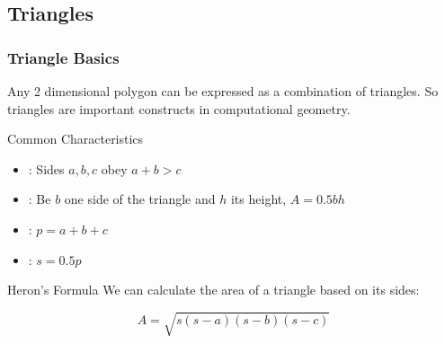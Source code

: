 \documentclass{beamer}
\begin{document}
\subsection{Triangles}
\begin{frame}
  \frametitle{Triangle Basics}
  {\smaller
    Any 2 dimensional polygon can be expressed as a combination of
    triangles. So triangles are important constructs in computational
    geometry.

    \begin{block}{Common Characteristics}
      \begin{itemize}
      \item {}: Sides $a,b,c$ obey $a+b > c$
      \item {}: Be $b$ one side of the triangle
        and $h$ its height, $A=0.5bh$
      \item {}: $p=a+b+c$
      \item {}: $s = 0.5p$
      \end{itemize}
    \end{block}

    \begin{block}{Heron's Formula}
      We can calculate the area of a triangle based on its sides:

      \begin{equation*}
        A = \sqrt{s(s-a)(s-b)(s-c)}
      \end{equation*}
    \end{block}


  }
\end{frame}

\end{document}

